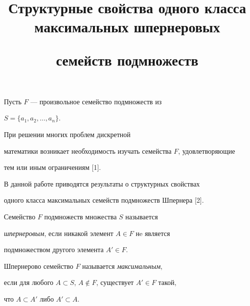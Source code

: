 \title{Структурные свойства одного класса максимальных шпернеровых 


семейств подмножеств} 


 


\date{} 




\pagestyle{plain} %


 




\maketitle 


\label{begin} 


 


 


 


Пусть $F$ --- произвольное семейство подмножеств из 


$S=\{a_1,a_2,\dotsc,a_n\}$. 


При решении многих проблем дискретной 


математики возникает необходимость изучать семейства $F$, удовлетворяющие 


тем или иным ограничениям [1]. 


В данной работе приводятся результаты о структурных свойствах 


одного класса максимальных семейств подмножеств Шпернера [2]. 


 


\begin{defn} 


Семейство $F$ подмножеств множества $S$ называется 


{\it шпернеровым}, если никакой элемент $A\in F$ нe является 


подмножеством другого элемента $A'\in F$. 


\end{defn} 


 


 


\begin{defn} 


Шпернерово семейство $F$ называется {\it максимальным}, 


если для любого $A\subset S$, $A\notin F$, существует $A'\in F$ такой, 


что $A\subset A'$ либо $A'\subset A$. 


\end{defn} 


